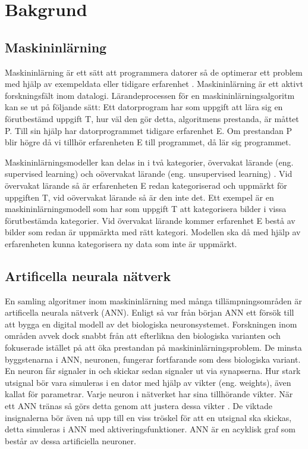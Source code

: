 \documentclass[]{kththesis}
\begin{document}
\chapter{Bakgrund}

\section{Maskininlärning}
Maskininlärning är ett sätt att programmera datorer så de optimerar ett problem med hjälp av exempeldata eller tidigare erfarenhet \parencite{alpaydin2009introduction}. Maskininlärning är ett aktivt forskningsfält inom datalogi. Lärandeprocessen för en maskininlärningsalgoritm kan se ut på följande sätt: Ett datorprogram har som uppgift att lära sig en förutbestämd uppgift T, hur väl den gör detta, algoritmens prestanda, är måttet P. Till sin hjälp har datorprogrammet tidigare erfarenhet E. Om prestandan P blir högre då vi tillhör erfarenheten E till programmet, då lär sig programmet.

Maskininlärningsmodeller kan delas in i två kategorier, övervakat lärande (eng. supervised learning) och oövervakat lärande (eng. unsupervised learning) \parencite{murphy2012machine}. Vid övervakat lärande så är erfarenheten E redan kategoriserad och uppmärkt för uppgiften T, vid oövervakat lärande så är den inte det. Ett exempel är en maskininlärningsmodell som har som uppgift T att kategorisera bilder i vissa förutbestämda kategorier. Vid övervakat lärande kommer erfarenhet E bestå av bilder som redan är uppmärkta med rätt kategori. Modellen ska då med hjälp av erfarenheten kunna kategorisera ny data som inte är uppmärkt. 

\section{Artificella neurala nätverk}
En samling algoritmer inom maskininlärning med många tillämpningsområden är artificella neurala nätverk (ANN). Enligt \textcite{Goodfellow-et-al-2016} så var från början ANN ett försök till att bygga en digital modell av det biologiska neuronsystemet. Forskningen inom områden avvek dock snabbt från att efterlikna den biologiska varianten och fokuserade istället på att öka prestandan på maskininlärningsproblem. De minsta byggstenarna i ANN, neuronen, fungerar fortfarande som dess biologiska variant. En neuron får signaler in och skickar sedan signaler ut via synapserna. Hur stark utsignal bör vara simuleras i en dator med hjälp av vikter (eng. weights), även kallat för parametrar. Varje neuron i nätverket har sina tillhörande vikter. När ett ANN tränas så görs detta genom att justera dessa vikter \parencite{Goodfellow-et-al-2016}. De viktade insignalerna bör även nå upp till en viss tröskel för att en utsignal ska skickas, detta simuleras i ANN med aktiveringsfunktioner. ANN är en acyklisk graf som består av dessa artificiella neuroner.
\end{document}

